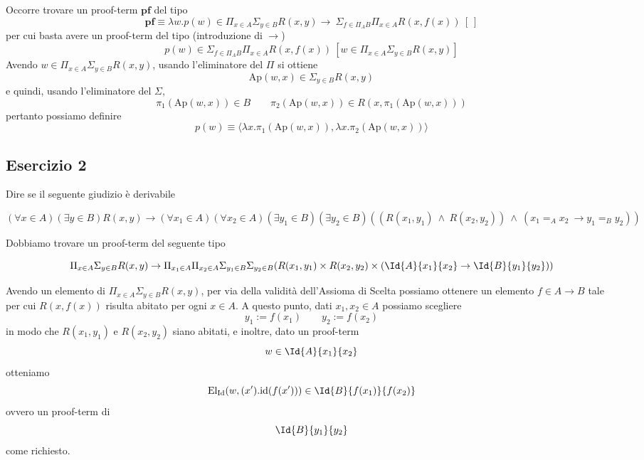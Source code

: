 \proof
Occorre trovare un proof-term $\textbf{pf}$ del tipo
\[\textbf{pf} \equiv \lambda w.p(w) \in \Pi_{x\in A}\Sigma_{y\in B}R(x,y)\to\ \Sigma_{f\in {\Pi_A B}}\Pi_{x\in A}R(x, f(x))\ [\ ] \]
per cui basta avere un proof-term del tipo (introduzione di $\to$)
\[ p(w) \in \Sigma_{f\in {\Pi_A B}}\Pi_{x\in A}R(x, f(x))\ [w\in \Pi_{x\in A}\Sigma_{y\in B}R(x,y) ] \]
Avendo $w\in \Pi_{x\in A}\Sigma_{y\in B}R(x,y)$, usando l'eliminatore del $\Pi$ si ottiene 
\[ \mathrm{Ap}(w, x)\in \Sigma_{y\in B}R(x,y) \]
e quindi, usando l'eliminatore del $\Sigma$,
\[ \pi_1(\mathrm{Ap}(w,x))\in B \qquad \pi_2(\mathrm{Ap}(w,x))\in R(x, \pi_1(\mathrm{Ap}(w, x)))\]
pertanto possiamo definire
\[ p(w) \equiv \langle \lambda x. \pi_1(\mathrm{Ap}(w, x)), \lambda x.\pi_2(\mathrm{Ap}(w, x))\rangle \]
\endproof

\subsection{Esercizio 2}
\begin{thm}
	Dire se il seguente giudizio è derivabile
	\begin{scriptsize}
		\[(\forall x \in A)(\exists y \in B)R(x, y) \to (\forall x_1\in A)(\forall x_2\in A)(\exists y_1\in B)(\exists y_2\in B)(( R(x_1, y_1)\ \wedge\ R(x_2, y_2))\ \wedge\  (x_1 =_A x_2\ \to y_1 =_B y_2))\]
	\end{scriptsize}
\end{thm}
\proof
Dobbiamo trovare un proof-term del seguente tipo
\begin{scriptsize}
	\[ \Pi_{x\in A}\Sigma_{y\in B}R(x, y) \to \Pi_{x_1\in A}\Pi_{x_2\in A}\Sigma_{y_1\in B}\Sigma_{y_2\in B}(R(x_1, y_1)\times R(x_2, y_2)\times (\Id{A}{x_1}{x_2} \to \Id{B}{y_1}{y_2}))\]
\end{scriptsize}
Avendo un elemento di $\Pi_{x\in A}\Sigma_{y\in B}R(x,y)$, per via della validità dell'Assioma di Scelta possiamo ottenere un elemento $f \in A \to B$ tale per cui $R(x, f(x))$ risulta abitato per ogni $x \in A$. A questo punto, dati $x_1, x_2 \in A$ possiamo scegliere
\[ y_1 := f(x_1) \qquad y_2 := f(x_2) \]
in modo che $R(x_1, y_1)$ e $R(x_2, y_2)$ siano abitati, e inoltre, dato un proof-term
\[ w \in \Id{A}{x_1}{x_2}\]
otteniamo
\[ \mathrm{El}_{\mathrm{Id}}(w, (x').\mathrm{id}(f(x'))) \in \Id{B}{f(x_1)}{f(x_2)}\] ovvero un proof-term di 
\[ \Id{B}{y_1}{y_2} \]
come richiesto.
\endproof

